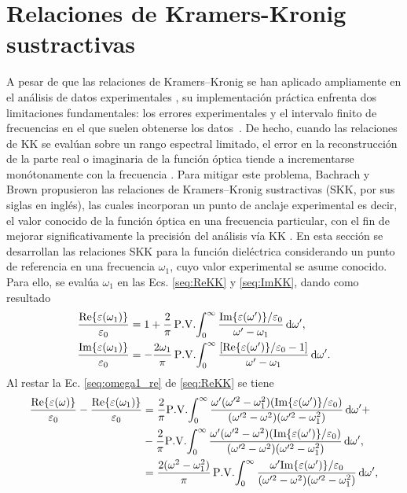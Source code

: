 \section{Relaciones de Kramers-Kronig sustractivas}
\label{section:SSKK}
\vspace{-0.4cm}

A pesar de que las relaciones de Kramers–Kronig se han aplicado ampliamente en el análisis de datos experimentales \cite{nakovUnifiedFrameworkNumerical2023}, su implementación práctica enfrenta dos limitaciones fundamentales: los errores experimentales y el intervalo finito de frecuencias en el que suelen obtenerse los datos~\cite{nakovUnifiedFrameworkNumerical2023}. De hecho, cuando las relaciones de KK se evalúan sobre un rango espectral limitado, el error en la reconstrucción de la parte real o imaginaria de la función óptica tiende a incrementarse monótonamente con la frecuencia \cite{miltonFiniteFrequencyRange1997}. Para mitigar este problema, Bachrach y Brown \cite{bachrachExcitonOpticalPropertiesTlBr1970} propusieron las relaciones de Kramers–Kronig sustractivas (SKK, por sus siglas en inglés), las cuales incorporan un punto de anclaje experimental es decir, el valor conocido de la función óptica en una frecuencia particular, con el fin de mejorar significativamente la precisión del análisis vía KK \cite{lucariniKramersKronigRelationsOptical2005}. En esta sección se desarrollan las relaciones SKK para la función dieléctrica considerando un punto de referencia en una frecuencia $\omega_1$, cuyo valor experimental se asume conocido. Para ello, se evalúa $\omega_1$ en las Ecs. \eqref{seq:ReKK} y \eqref{seq:ImKK}, dando como resultado
%
\begin{align}
		\frac{\text{Re}\{\varepsilon(\omega_1)\}}{\varepsilon_0}&=1+\frac{2}{\pi}\,\PV{\int_{0}^{\infty}\frac{\text{Im}\{\varepsilon(\omega')\}/\varepsilon_0}{\omega'-\omega_1}\dd{\omega'}}, \label{seq:omega1_re}\\
		\frac{\text{Im}\{\varepsilon(\omega_1)\}}{\varepsilon_0}&=-\frac{2\omega_1}{\pi}\,\PV{\int_{0}^{\infty}\frac{[\text{Re}\{\varepsilon(\omega')\}/\varepsilon_0-1]}{\omega'-\omega_1}\dd{\omega'}}.\label{seq:omega1_im}	
\end{align}
%
Al restar la Ec. \eqref{seq:omega1_re} de \eqref{seq:ReKK} se tiene %
%
\begin{align}
	\frac{\text{Re}\{\varepsilon(\omega)\}}{\varepsilon_0}-\frac{\text{Re}\{\varepsilon(\omega_1)\}}{\varepsilon_0}&=\frac{2}{\pi}\PV{\int_{0}^{\infty} \frac{\omega'(\omega'^2-\omega_1^2)(\text{Im}\{\varepsilon(\omega')\}/\varepsilon_0)}{(\omega'^2-\omega^2)(\omega'^2-\omega_1^2)}\dd{\omega'}}+\nonumber\\
	&-\frac{2}{\pi}\PV{\int_{0}^{\infty} \frac{\omega'(\omega'^2-\omega^2)(\text{Im}\{\varepsilon(\omega')\}/\varepsilon_0)}{(\omega'^2-\omega^2)(\omega'^2-\omega_1^2)}\dd{\omega'}},\nonumber\\
	&=\frac{2(\omega^2-\omega_1^2)}{\pi}\,\PV{\int_{0}^{\infty}\frac{\omega'\text{Im}\{\varepsilon(\omega')\}/\varepsilon_0}{(\omega'^2-\omega^2)(\omega'^2-\omega_1^2)}\dd{\omega'}},\label{seq:SSKKRe0}
\end{align}
%


